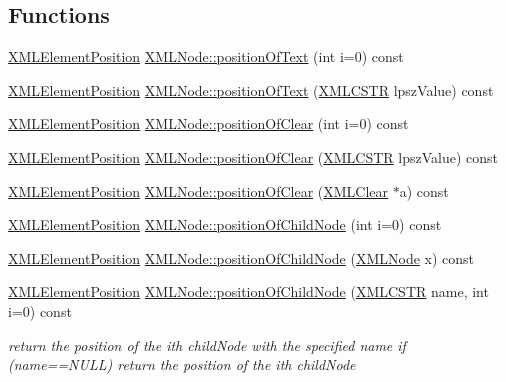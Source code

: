 \subsection*{Functions}
\begin{DoxyCompactItemize}
\item 
\hyperlink{xmlParser_8h_aab10d65aadeca1f026f6416becde7432}{X\-M\-L\-Element\-Position} \hyperlink{group__xmlPosition_ga4376524698201e37c805bfa37945a600}{X\-M\-L\-Node\-::position\-Of\-Text} (int i=0) const 
\item 
\hyperlink{xmlParser_8h_aab10d65aadeca1f026f6416becde7432}{X\-M\-L\-Element\-Position} \hyperlink{group__xmlPosition_ga3a590db071ce9f3fdc6e82405ab8507d}{X\-M\-L\-Node\-::position\-Of\-Text} (\hyperlink{xmlParser_8h_acdb0d6fd8dd596384b438d86cfb2b182}{X\-M\-L\-C\-S\-T\-R} lpsz\-Value) const 
\item 
\hyperlink{xmlParser_8h_aab10d65aadeca1f026f6416becde7432}{X\-M\-L\-Element\-Position} \hyperlink{group__xmlPosition_gafbeb4c6fcb5f164a4e5501d048c0f714}{X\-M\-L\-Node\-::position\-Of\-Clear} (int i=0) const 
\item 
\hyperlink{xmlParser_8h_aab10d65aadeca1f026f6416becde7432}{X\-M\-L\-Element\-Position} \hyperlink{group__xmlPosition_gaae9a760878f7e2d8e392b17edb00ea19}{X\-M\-L\-Node\-::position\-Of\-Clear} (\hyperlink{xmlParser_8h_acdb0d6fd8dd596384b438d86cfb2b182}{X\-M\-L\-C\-S\-T\-R} lpsz\-Value) const 
\item 
\hyperlink{xmlParser_8h_aab10d65aadeca1f026f6416becde7432}{X\-M\-L\-Element\-Position} \hyperlink{group__xmlPosition_ga917818941aa305d3829472d49f33a4b5}{X\-M\-L\-Node\-::position\-Of\-Clear} (\hyperlink{structXMLClear}{X\-M\-L\-Clear} $\ast$a) const 
\item 
\hyperlink{xmlParser_8h_aab10d65aadeca1f026f6416becde7432}{X\-M\-L\-Element\-Position} \hyperlink{group__xmlPosition_gac98af1de6ed1218e5d26f7e509b8678f}{X\-M\-L\-Node\-::position\-Of\-Child\-Node} (int i=0) const 
\item 
\hyperlink{xmlParser_8h_aab10d65aadeca1f026f6416becde7432}{X\-M\-L\-Element\-Position} \hyperlink{group__xmlPosition_gaf8457366bc393a57e33896e46592cb3e}{X\-M\-L\-Node\-::position\-Of\-Child\-Node} (\hyperlink{structXMLNode}{X\-M\-L\-Node} x) const 
\item 
\hyperlink{xmlParser_8h_aab10d65aadeca1f026f6416becde7432}{X\-M\-L\-Element\-Position} \hyperlink{group__xmlPosition_ga102dcd93d13144e2a87b664e6f810725}{X\-M\-L\-Node\-::position\-Of\-Child\-Node} (\hyperlink{xmlParser_8h_acdb0d6fd8dd596384b438d86cfb2b182}{X\-M\-L\-C\-S\-T\-R} name, int i=0) const 
\begin{DoxyCompactList}\small\item\em return the position of the ith child\-Node with the specified name if (name==N\-U\-L\-L) return the position of the ith child\-Node \end{DoxyCompactList}\end{DoxyCompactItemize}


